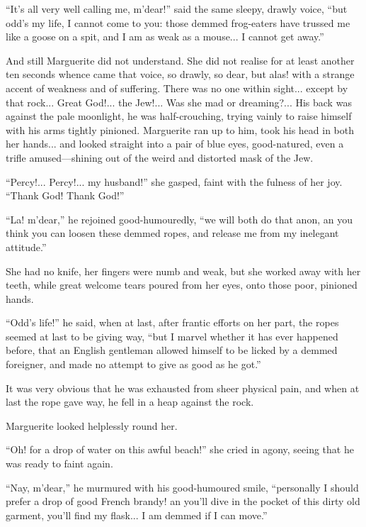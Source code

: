 \documentclass[paper=a5,BCOR=7mm,twoside,DIV=calc,12pt,usegeometry,chapterprefix,endperiod,headings=big]{scrbook}
\begin{document}
\enquote{It's all very well calling me, m'dear!} said the same sleepy, drawly voice, \enquote{but odd's my life, I cannot come to you: those demmed frog-eaters have trussed me like a goose on a spit, and I am as weak as a mouse... I cannot get away.}

And still Marguerite did not understand. She did not realise for at least another ten seconds whence came that voice, so drawly, so dear, but alas! with a strange accent of weakness and of suffering. There was no one within sight... except by that rock... Great God!... the Jew!... Was she mad or dreaming?... His back was against the pale moonlight, he was half-crouching, trying vainly to raise himself with his arms tightly pinioned. Marguerite ran up to him, took his head in both her hands... and looked straight into a pair of blue eyes, good-natured, even a trifle amused---shining out of the weird and distorted mask of the Jew.

\enquote{Percy!... Percy!... my husband!} she gasped, faint with the fulness of her joy. \enquote{Thank God! Thank God!}

\enquote{La! m'dear,} he rejoined good-humouredly, \enquote{we will both do that anon, an you think you can loosen these demmed ropes, and release me from my inelegant attitude.}

She had no knife, her fingers were numb and weak, but she worked away with her teeth, while great welcome tears poured from her eyes, onto those poor, pinioned hands.

\enquote{Odd's life!} he said, when at last, after frantic efforts on her part, the ropes seemed at last to be giving way, \enquote{but I marvel whether it has ever happened before, that an English gentleman allowed himself to be licked by a demmed foreigner, and made no attempt to give as good as he got.}

It was very obvious that he was exhausted from sheer physical pain, and when at last the rope gave way, he fell in a heap against the rock.

Marguerite looked helplessly round her.

\enquote{Oh! for a drop of water on this awful beach!} she cried in agony, seeing that he was ready to faint again.

\enquote{Nay, m'dear,} he murmured with his good-humoured smile, \enquote{personally I should prefer a drop of good French brandy! an you'll dive in the pocket of this dirty old garment, you'll find my flask... I am demmed if I can move.}
\end{document}
